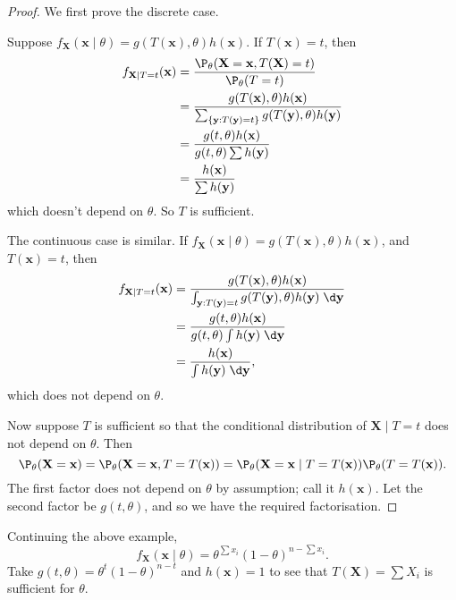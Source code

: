 \documentclass[a4paper]{article}
\begin{document}
\begin{proof}
  We first prove the discrete case.

  Suppose $f_\mathbf{X}(\mathbf{x}\mid \theta) = g(T(\mathbf{x}), \theta)h(\mathbf{x})$. If $T(\mathbf{x}) = t$, then
  \begin{align*}
    f_{\mathbf{X}\mid T = t}(\mathbf{x}) &= \frac{\P_\theta(\mathbf{X} = \mathbf{x}, T(\mathbf{X}) = t)}{\P_\theta (T = t)}\\
    &= \frac{g(T(\mathbf{x}), \theta)h(\mathbf{x})}{\sum_{\{\mathbf{y}:T(\mathbf{y}) = t\}}g(T(\mathbf{y}), \theta)h(\mathbf{y})}\\
    &=\frac{g(t, \theta)h(\mathbf{x})}{g(t, \theta)\sum h(\mathbf{y})}\\
    &= \frac{h(\mathbf{x})}{\sum h(\mathbf{y})}
  \end{align*}
  which doesn't depend on $\theta$. So $T$ is sufficient.

  The continuous case is similar. If $f_\mathbf{X}(\mathbf{x} \mid \theta) = g(T(\mathbf{x}), \theta)h(\mathbf{x})$, and $T(\mathbf{x}) = t$, then
  \begin{align*}
    f_{\mathbf{X}\mid T = t}(\mathbf{x}) &= \frac{g(T(\mathbf{x}), \theta) h(\mathbf{x})}{\int_{\mathbf{y}: T(\mathbf{y}) = t} g(T(\mathbf{y}), \theta) h(\mathbf{y})\;\d \mathbf{y}}\\
    &= \frac{g(t, \theta) h(\mathbf{x})}{g(t, \theta) \int h(\mathbf{y}) \;\d \mathbf{y}}\\
    &= \frac{h(\mathbf{x})}{\int h(\mathbf{y})\;\d \mathbf{y}},
  \end{align*}
  which does not depend on $\theta$.

  Now suppose $T$ is sufficient so that the conditional distribution of $\mathbf{X}\mid T = t$ does not depend on $\theta$. Then
  \[
    \P_\theta(\mathbf{X} = \mathbf{x}) = \P_\theta(\mathbf{X} = \mathbf{x}, T=T(\mathbf{x})) = \P_\theta(\mathbf{X} = \mathbf{x}\mid T = T(\mathbf{x}))\P_\theta (T = T(\mathbf{x})).
  \]
  The first factor does not depend on $\theta$ by assumption; call it $h(\mathbf{x})$. Let the second factor be $g(t, \theta)$, and so we have the required factorisation.
\end{proof}

\begin{eg}
  Continuing the above example,
  \[
    f_\mathbf{X}(\mathbf{x}\mid \theta) = \theta^{\sum x_i}(1 - \theta)^{n - \sum x_i}.
  \]
  Take $g(t, \theta) = \theta^t(1 - \theta)^{n - t}$ and $h(\mathbf{x}) = 1$ to see that $T(\mathbf{X}) = \sum X_i$ is sufficient for $\theta$.
\end{eg}
\end{document}
